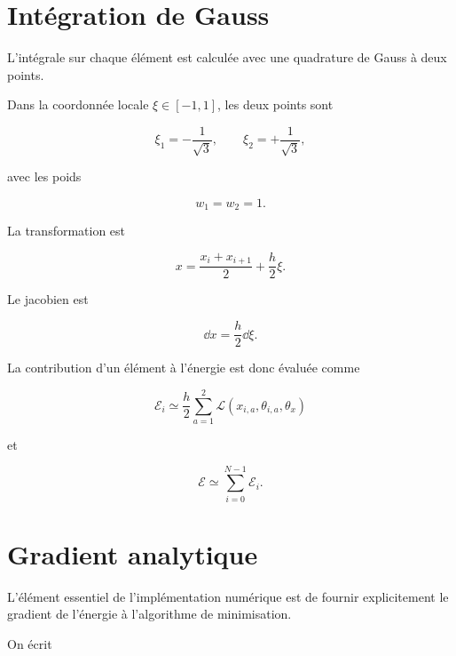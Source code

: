 \documentclass[a4paper,11pt]{article}
\begin{document}
\section{Intégration de Gauss}

L'intégrale sur chaque élément est calculée avec une quadrature de Gauss
à deux points.

Dans la coordonnée locale $\xi\in[-1,1]$, les deux points sont

\begin{equation}
\xi_1=-\frac{1}{\sqrt{3}},
\qquad
\xi_2=+\frac{1}{\sqrt{3}},
\end{equation}

avec les poids

\begin{equation}
w_1=w_2=1.
\end{equation}

La transformation est

\begin{equation}
x
=
\frac{x_i+x_{i+1}}{2}
+
\frac{h}{2}\xi.
\end{equation}

Le jacobien est

\begin{equation}
\dd x=\frac{h}{2}\dd\xi.
\end{equation}

La contribution d'un élément à l'énergie est donc évaluée comme

\begin{equation}
\mathcal E_i
\simeq
\frac{h}{2}
\sum_{a=1}^{2}
\mathcal L(x_{i,a},\theta_{i,a},\theta_x)
\end{equation}

et

\begin{equation}
\boxed{
\mathcal E
\simeq
\sum_{i=0}^{N-1}\mathcal E_i.
}
\end{equation}

\section{Gradient analytique}

L'élément essentiel de l'implémentation numérique est de fournir
explicitement le gradient de l'énergie à l'algorithme de minimisation.

On écrit
\end{document}
